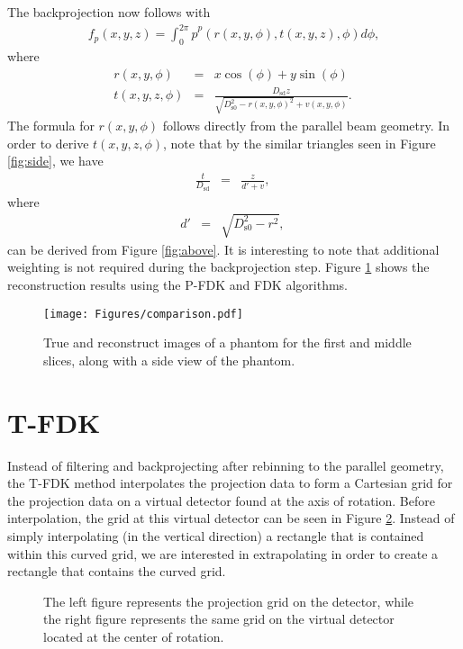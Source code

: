 \documentclass[12pt]{elsarticle}
\begin{document}
The backprojection now follows with
\begin{eqnarray*}
f_p(x,y,z) = \int_0^{2\pi} \hat{p}^p(r(x,y,\phi),t(x,y,z),\phi) d\phi,
\end{eqnarray*}
where
\begin{eqnarray*}
r(x,y,\phi) &=& x \cos(\phi) + y \sin(\phi) \\
t(x,y,z,\phi) &=& \frac{D_\mathrm{sd}z}{\sqrt{D_\mathrm{s0}^2-r(x,y,\phi)^2}+v(x,y,\phi)}. \
\end{eqnarray*}
The formula for $r(x,y,\phi)$ follows directly from the parallel beam geometry. In order to derive 
$t(x,y,z,\phi)$, note that by the similar triangles seen in Figure \ref{fig:side}, we have 
\begin{eqnarray*}
\frac{t}{D_\mathrm{sd}} &=& \frac{z}{d'+v}, \
\end{eqnarray*}
where
\begin{eqnarray*}
d'&=& \sqrt{D_\mathrm{s0}^2-r^2}, \
\end{eqnarray*}
can be derived from Figure \ref{fig:above}. It is interesting to note that additional weighting is not
required during the backprojection step. Figure \ref{fig:comp} shows the reconstruction results using
the P-FDK and FDK algorithms. 

\begin{figure}[tbh]
\centering
\texttt{[image: Figures/comparison.pdf]}
\caption{True and reconstruct images of a phantom for the first and middle slices, along with a side
view of the phantom.}
\label{fig:comp}
\end{figure}

\section{T-FDK}
Instead of filtering and backprojecting after rebinning to the parallel geometry, the T-FDK method interpolates the projection data to form a Cartesian grid for the projection data on a virtual detector found at the axis of rotation. Before interpolation, the grid at this virtual detector can be seen in Figure \ref{grid}. Instead of simply interpolating (in the vertical direction) a rectangle that is contained within this curved grid, we are interested in extrapolating in order to create a rectangle that contains the curved grid.

\begin{figure}[tbh]
\centering
\mbox{}
\caption{The left figure represents the projection grid on the detector, while the right figure represents the
same grid on the virtual detector located at the center of rotation.}
\label{grid}
\end{figure}
\end{document}

